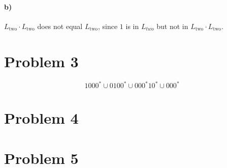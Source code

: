 \documentclass[12pt]{article}
\begin{document}
\paragraph{b)}

\(L_\text{two}\cdot L_\text{two}\) does not equal \(L_\text{two}\), since \(1\) is in \(L_{two}\) but not in \(L_\text{two}\cdot L_\text{two}\).

\section*{Problem 3}

\[1000^* \cup 0100^* \cup 000^*10^* \cup 000^*\]

\section*{Problem 4}

\section*{Problem 5}
\end{document}
